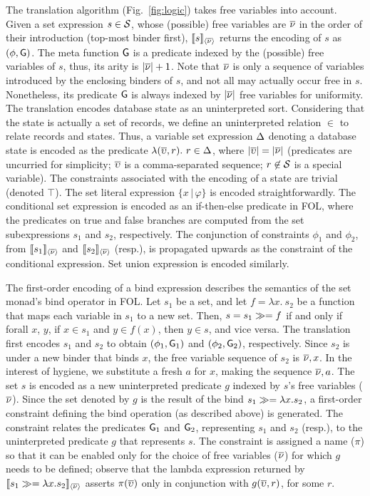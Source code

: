The translation algorithm (Fig.~\ref{fig:logic}) takes free variables
into account. Given a set expression $s\in\mathcal{S}$, whose (possible) free
variables are $\overline{\nu}$ in the order of their introduction (top-most
binder first), $\llbracket s \rrbracket_{\langle \overline{\nu} \rangle}$ returns the encoding of $s$ as
$(\phi,{\sf G})$.  The meta function ${\sf G}$ is a predicate indexed by the
(possible) free variables of $s$, thus, its arity is $|\overline{\nu}| + 1$.
Note that $\overline{\nu}$ is only a sequence of variables introduced by the
enclosing binders of $s$, and not all may actually occur free in $s$.
Nonetheless, its predicate ${\sf G}$ is always indexed by $|\overline{\nu}|$ free
variables for uniformity. The translation encodes database state as an
uninterpreted sort. Considering that the state is actually a set of
records, we define an uninterpreted relation $\in$ to relate records
and states. Thus, a variable set expression $\Delta$ denoting a database
state is encoded as the predicate $\lambda (\overline{\upsilon},r).~r\in\Delta$, where
$|\overline{\upsilon}|=|\overline{\nu}|$ (predicates are uncurried for simplicity; $\overline{\upsilon}$
is a comma-separated sequence; $r\not\in\mathcal{S}$ is a special variable).
The constraints associated with the encoding of a state are trivial
(denoted $\top$). The set literal expression $\{x\,|\, \varphi\}$ is encoded
straightforwardly. The conditional set expression is encoded as an
if-then-else predicate in FOL, where the predicates on true and false
branches are computed from the set subexpressions $s_1$ and $s_2$,
respectively. The conjunction of constraints $\phi_1$ and $\phi_2$,
from $\llbracket s_1 \rrbracket_{\langle \overline{\nu} \rangle}$ and $\llbracket s_2 \rrbracket_{\langle \overline{\nu} \rangle}$ (resp.), is
propagated upwards as the constraint of the conditional expression.
Set union expression is encoded similarly.

The first-order encoding of a bind expression describes the semantics
of the set monad's bind operator in FOL. Let $s_1$ be a set, and let $f =
\lambda x.~s_2$ be a function that maps each variable in $s_1$ to a
new set. Then, $s = s_1 \gg= f$ if and only if forall $x$, $y$, if
$x\in s_1$ and $y \in f(x)$, then  $y \in s$, and vice versa. The
translation first encodes $s_1$ and $s_2$ to obtain $(\phi_1,{\sf G}_1)$
and $(\phi_2,{\sf G}_2)$, respectively. Since $s_2$ is under a new binder
that binds $x$, the free variable sequence of $s_2$ is $\overline{\nu},x$. In the
interest of hygiene, we substitute a fresh $a$ for $x$, making the
sequence $\overline{\nu},a$. The set $s$ is encoded as a new uninterpreted
predicate $g$ indexed by $s$'s free variables ($\overline{\nu}$). Since the
set denoted by $g$ is the result of the bind $s_1 \gg= \lambda
x.s_2$, a first-order constraint defining the bind operation (as
described above) is generated. The constraint relates the predicates
${\sf G}_1$ and ${\sf G}_2$, representing $s_1$ and $s_2$ (resp.), to the
uninterpreted predicate $g$ that represents $s$. The constraint is
assigned a name ($\pi$) so that it can be enabled only for the choice
of free variables ($\overline{\nu}$) for which $g$ needs to be defined;
observe that the lambda expression returned by $\llbracket s_1 \gg=
\lambda x.s_2 \rrbracket_{\langle \overline{\nu} \rangle}$ asserts $\pi(\overline{\upsilon})$ only in conjunction with
$g(\overline{\upsilon},r)$, for some $r$.

